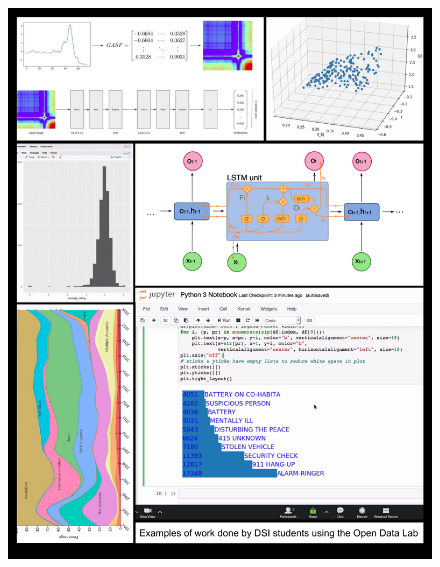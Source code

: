 \documentclass[12pt,letterpaper]{report} %
\begin{document}
\cleardoublepage
\begin{figure}[!hbtp]
\includegraphics[width=\textwidth]{cover-images/ODLBackCover-neat}
\end{figure}
\end{document}
